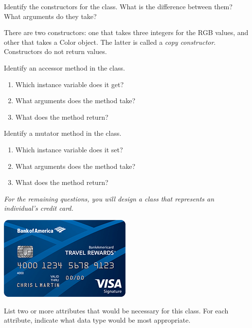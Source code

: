 

\Q Identify the constructors for the  class. What is the difference between them? What arguments do they take?

\begin{answer}
There are two constructors: one that takes three integers for the RGB values, and other that takes a Color object. The latter is called a \emph{copy constructor}. Constructors do not return values.
\end{answer}


\Q Identify an accessor method in the  class. 
\begin{enumerate}[itemsep=1pt]
\item Which instance variable does it get? 
\item What arguments does the method take? 
\item What does the method return? 
\end{enumerate}


\Q Identify a mutator method in the  class.
\begin{enumerate}[itemsep=1pt]
\item Which instance variable does it set? 
\item What arguments does the method take? 
\item What does the method return? 
\end{enumerate}


\begin{center}
\textit{For the remaining questions, you will design a class that represents an individual's credit card.}
\bigskip\par
\includegraphics{credit-card.png}
\end{center}


\Q List two or more attributes that would be necessary for this  class. For each attribute, indicate what data type would be most appropriate.


